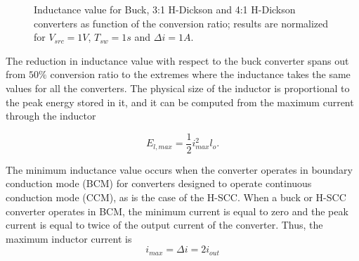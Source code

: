 \begin{SCfigure}[][!h]
\centering
{}
\caption{Inductance value for Buck, 3:1 H-Dickson and 4:1 H-Dickson converters as function of the conversion ratio; results are normalized  for $V_{src} = 1V$, $T_{sw}=1s$ and $\Delta i = 1A$.}
\label{fig:inductor_size}
\end{SCfigure}

The reduction in inductance value with respect to the buck converter spans out from $50\%$ conversion ratio to the extremes where the inductance takes the same values for all the converters. The physical size of the inductor is proportional to the peak energy stored in it, and it can be computed from the maximum current through the inductor

\begin{equation}
 E_{l,max}  = \frac{1}{2} i_{max}^2 l_{o}.
\label{eq:eng_L}
\end{equation}

The minimum inductance value occurs when the converter operates in boundary conduction mode (BCM) for converters designed to operate continuous conduction mode (CCM), as is the case of the H-SCC. When a buck or H-SCC converter operates in BCM, the minimum current is equal to zero and the peak current is equal to twice of the output current of the converter. Thus, the maximum inductor current is
\begin{equation}
 i_{max} = \Delta i  = 2 i_{out}
\label{eq:i_max}
\end{equation}

